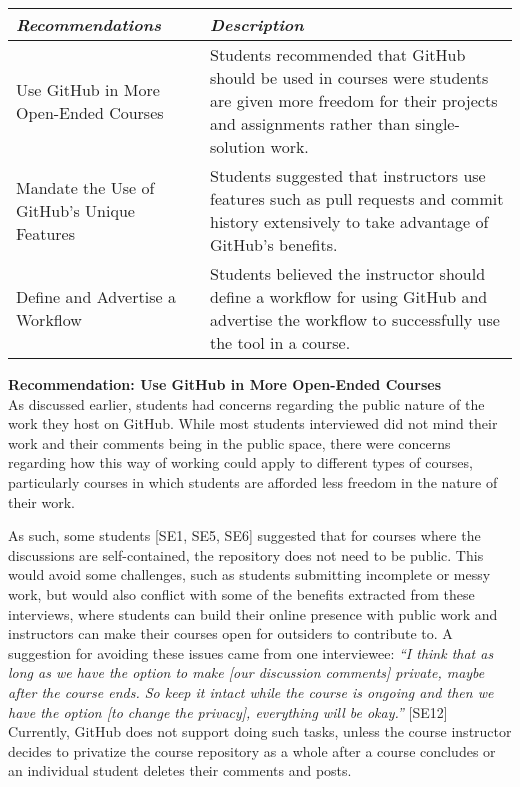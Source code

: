 \begin{center}
\begin{tabular}{ | m{2em} | m{5cm} | }
\hline
\emph{Recommendations} & \emph{Description} \\
\hline
Use GitHub in More Open-Ended Courses & Students recommended that GitHub should be used in courses were students are given more freedom for their projects and assignments rather than single-solution work. \\
\hline
Mandate the Use of GitHub's Unique Features & Students suggested that instructors use features such as pull requests and commit history extensively to take advantage of GitHub's benefits. \\
\hline
Define and Advertise a Workflow & Students believed the instructor should define a workflow for using GitHub and advertise the workflow to successfully use the tool in a course. \\
\hline
\end{tabular}
\end{center}

\textbf{Recommendation: Use GitHub in More Open-Ended Courses} \\
As discussed earlier, students had concerns regarding the public nature of the work they host on GitHub. While most students interviewed did not mind their work and their comments being in the public space, there were concerns regarding how this way of working could apply to different types of courses, particularly courses in which students are afforded less freedom in the nature of their work. %

As such, some students [SE1, SE5, SE6] suggested that for courses where the discussions are self-contained, the repository does not need to be public. This would avoid some challenges, such as students submitting incomplete or messy work, but would also conflict with some of the benefits extracted from these interviews, where students can build their online presence with public work and instructors can make their courses open for outsiders to contribute to. A suggestion for avoiding these issues came from one interviewee: \textit{``I think that as long as we have the option to make [our discussion comments] private, maybe after the course ends. So keep it intact while the course is ongoing and then we have the option [to change the privacy], everything will be okay.''} [SE12] Currently, GitHub does not support doing such tasks, unless the course instructor decides to privatize the course repository as a whole after a course concludes or an individual student deletes their comments and posts. %

